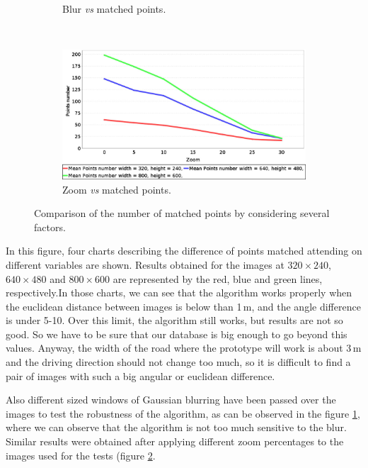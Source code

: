 \begin{figure}[h!]
\begin{subfigure}[b]{0.45\textwidth}
	  \caption{Blur \emph{vs} matched points.}\label{fig:cp01_blur_vs_matched}
        \end{subfigure}%
        ~
        \begin{subfigure}[b]{0.45\textwidth}
	    \includegraphics[width=\textwidth]{zoomVsMatches}
	  \caption{Zoom \emph{vs} matched points.}\label{fig:cp01_zoom_vs_matched}
        \end{subfigure}%
        \caption{Comparison of the number of matched points by considering several factors.}\label{fig:cp01_matching_results}
\end{figure}

In this figure, four charts describing the difference of points matched attending on different variables are shown. Results obtained for the images at $320 \times 240$, $640 \times 480$ and $800 \times 600$ are represented by the red, blue and green lines, respectively.In those charts, we can see that the algorithm works properly when the euclidean distance between images is below than 1\,m, and the angle difference is under 5-10\textdegree. Over this limit, the algorithm still works, but results are not so good. So we have to be sure that our database is big enough to go beyond this values. Anyway, the width of the road where the prototype will work is about 3\,m and the driving direction should not change too much, so it is difficult to find a pair of images with such a big angular or euclidean difference.

Also different sized windows of Gaussian blurring have been passed over the images to test the robustness of the algorithm, as can be observed in the figure \ref{fig:cp01_blur_vs_matched}, where we can observe that the algorithm is not too much sensitive to the blur. Similar results were obtained after applying different zoom percentages to the images used for the tests (figure \ref{fig:cp01_zoom_vs_matched}.

